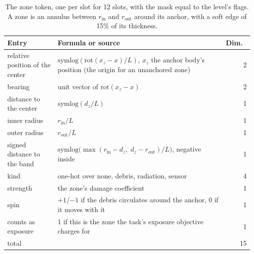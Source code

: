 \begin{table}[htbp]
\centering
\footnotesize
\begin{tabular}{p{4.3cm}p{6.6cm}r}
\toprule
Entry & Formula or source & Dim.\ \\
\midrule
relative position of the center & $\mathrm{symlog}(\mathrm{rot}(x_z - x)/L)$, $x_z$ the anchor body's position (the origin for an unanchored zone) & 2 \\
bearing & unit vector of $\mathrm{rot}(x_z - x)$ & 2 \\
distance to the center & $\mathrm{symlog}(d_z/L)$ & 1 \\
inner radius & $r_{\mathrm{in}}/L$ & 1 \\
outer radius & $r_{\mathrm{out}}/L$ & 1 \\
signed distance to the band & $\mathrm{symlog}\big(\max(r_{\mathrm{in}} - d_z,\; d_z - r_{\mathrm{out}})/L\big)$, negative inside & 1 \\
kind & one-hot over none, debris, radiation, sensor & 4 \\
strength & the zone's damage coefficient & 1 \\
spin & $+1$/$-1$ if the debris circulates around the anchor, 0 if it moves with it & 1 \\
counts as exposure & 1 if this is the zone the task's exposure objective charges for & 1 \\
\midrule
total & & 15 \\
\bottomrule
\end{tabular}
\caption{The zone token, one per slot for 12 slots, with the mask
 equal to the level's  flags. A zone is an
annulus between $r_{\mathrm{in}}$ and $r_{\mathrm{out}}$ around its anchor,
with a soft edge of 15\% of its thickness.}
\label{tab:obs-zone}
\end{table}

